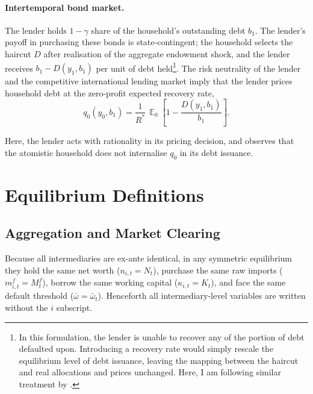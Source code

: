 \documentclass[11pt]{article}
\DeclareMathOperator{\E}{\mathbb{E}}
\theoremstyle{definition}
\theoremstyle{plain}
\theoremstyle{remark}
\newcommand{\mf}{m^{f}}
\newcommand{\Mf}{M^{f}}
\newcommand{\Rstar}{R^{*}}
\begin{document}
\paragraph{Intertemporal bond market.} The lender holds $1-\gamma$ share of the household's outstanding debt $b_1$. The lender's payoff in purchasing these bonds is state-contingent; the household selects the haircut $D$ after realisation of the aggregate endowment shock, and the lender receives $b_1-D(y_1,b_1)$ per unit of debt held\footnote{In this formulation, the lender is unable to recover any of the portion of debt defaulted upon. Introducing a recovery rate would simply rescale the equilibrium level of debt issuance, leaving the mapping between the haircut and real allocations and prices unchanged. Here, I am following similar treatment by \citep{eaton_debt_1981, arellano_default_2008}.}. The risk neutrality of the lender and the competitive international lending market imply that the lender prices household debt at the zero-profit expected recovery rate,
\begin{equation}\label{eq:bondprice}
q_0(y_0, b_1) = \frac{1}{\Rstar}\,\E_0\!\left[1 - \frac{D(y_1, b_1)}{b_1}\right].
\end{equation}

Here, the lender acts with rationality in its pricing decision, and observes that the atomistic household does not internalise $q_0$ in its debt issuance.

\section{Equilibrium Definitions} \label{sec:equilibrium}

\subsection{Aggregation and Market Clearing}

Because all intermediaries are ex-ante identical, in any symmetric equilibrium they hold the same net worth ($n_{i,t} = N_t$), purchase the same raw imports ($\mf_{i,t} = \Mf_t$), borrow the same working capital ($\kappa_{i,t} = K_t$), and face the same default threshold ($\bar{\omega} = \bar{\omega}_t$). Henceforth all intermediary-level variables are written without the $i$ subscript.
\end{document}
